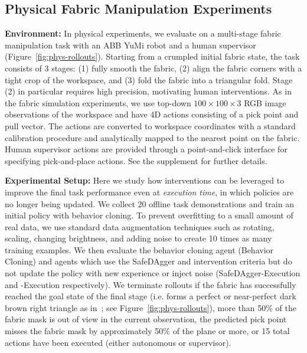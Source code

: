 \subsection{Physical Fabric Manipulation Experiments}\label{ssec:physresults}
\textbf{Environment: }
In physical experiments, we evaluate on a multi-stage fabric manipulation task with an ABB YuMi robot and a human supervisor (Figure~\ref{fig:phys-rollouts}). Starting from a crumpled initial fabric state, the task consists of 3 stages: (1) fully smooth the fabric, (2) align the fabric corners with a tight crop of the workspace, and (3) fold the fabric into a triangular fold. Stage (2) in particular requires high precision, motivating human interventions. As in the fabric simulation experiments, we use top-down $100 \times 100 \times 3$ RGB image observations of the workspace and have 4D actions consisting of a pick point and pull vector. The actions are converted to workspace coordinates with a standard calibration procedure and analytically mapped to the nearest point on the fabric. Human supervisor actions are provided through a point-and-click interface for specifying pick-and-place actions. See the supplement for further details.

\textbf{Experimental Setup: }
Here we study how interventions can be leveraged to improve the final task performance even at \textit{execution time}, in which policies are no longer being updated. We collect 20 offline task demonstrations and train an initial policy with behavior cloning. To prevent overfitting to a small amount of real data, we use standard data augmentation techniques such as rotating, scaling, changing brightness, and adding noise to create 10 times as many training examples. We then evaluate the behavior cloning agent (Behavior Cloning) and agents which use the SafeDAgger and \algname intervention criteria but do not update the policy with new experience or inject noise (SafeDAgger-Execution and \algname-Execution respectively). We terminate rollouts if the fabric has successfully reached the goal state of the final stage (i.e. forms a perfect or near-perfect dark brown right triangle as in~\citet{fabric_vsf}; see Figure~\ref{fig:phys-rollouts}), more than 50\% of the fabric mask is out of view in the current observation, the predicted pick point misses the fabric mask by approximately 50\% of the plane or more, or 15 total actions have been executed (either autonomous or supervisor).

